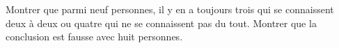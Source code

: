Montrer que parmi neuf personnes, il y en a toujours trois qui se connaissent deux à deux ou quatre qui ne se connaissent pas du tout. Montrer que la conclusion est fausse avec huit personnes.
